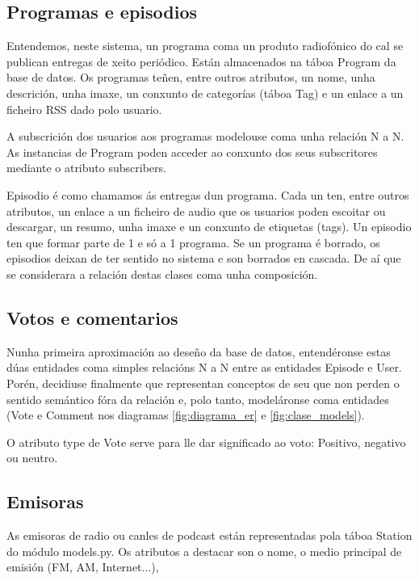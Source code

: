 \subsection{Programas e episodios}

Entendemos, neste sistema, un programa coma un produto radiofónico do cal se publican entregas de xeito periódico. Están almacenados na táboa Program da base de datos. Os programas teñen, entre outros atributos, un nome, unha descrición, unha imaxe, un conxunto de categorías (táboa Tag) e un enlace a un ficheiro RSS dado polo usuario.

A subscrición dos usuarios aos programas modelouse coma unha relación N a N. As instancias de Program poden acceder ao conxunto dos seus subscritores mediante o atributo subscribers.

Episodio é como chamamos ás entregas dun programa. Cada un ten, entre outros atributos, un enlace a un ficheiro de audio que os usuarios poden escoitar ou descargar, un resumo, unha imaxe e un conxunto de etiquetas (tags). Un episodio ten que formar parte de 1 e só a 1 programa. Se un programa é borrado, os episodios deixan de ter sentido no sistema e son borrados en cascada. De aí que se considerara a relación destas clases coma unha composición.

\subsection{Votos e comentarios}

Nunha primeira aproximación ao deseño da base de datos, entendéronse estas dúas entidades coma simples relacións N a N entre as entidades Episode e User. Porén, decidiuse finalmente que representan conceptos de seu que non perden o sentido semántico fóra da relación e, polo tanto, modeláronse coma entidades (Vote e Comment nos diagramas \ref{fig:diagrama_er} e \ref{fig:clase_models}).

O atributo type de Vote serve para lle dar significado ao voto: Positivo, negativo ou neutro.


\subsection{Emisoras}

As emisoras de radio ou canles de podcast están representadas pola táboa Station do módulo models.py. Os atributos a destacar son o nome, o medio principal de emisión (FM, AM, Internet...),  






